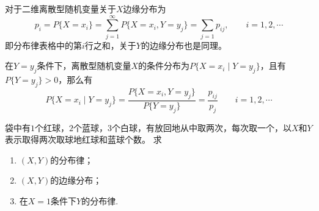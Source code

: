 对于二维离散型随机变量关于$X$边缘分布为
\begin{equation}
    p_i = P\{ X=x_i \} = \sum_{j=1}^\infty P\{ X=x_i, Y=y_j \} = \sum_{j=1} p_{ij}, \qquad i=1,2,\cdots
\end{equation}
即分布律表格中的第$i$行之和，关于$Y$的边缘分布也是同理。

在$Y=y_j$条件下，离散型随机变量$X$的条件分布为$P\{X=x_i\mid Y=y_j\}$，且有$P\{ Y=y_j \}>0$，那么有
\begin{equation}
    P\{ X=x_i \mid Y = y_j \} = \frac{P\{ X=x_i, Y=y_j \}}{P\{ Y=y_j \}} = \frac{p_{ij}}{p_j} \qquad i=1,2,\cdots
\end{equation}

\begin{example}
    袋中有$1$个红球，$2$个蓝球，$3$个白球，有放回地从中取两次，每次取一个，以$X$和$Y$表示取得两次取球地红球和蓝球个数。
    求
    \begin{enumerate}[(1)]
        \item $(X,Y)$的分布律；
        \item $(X,Y)$的边缘分布；
        \item 在$X=1$条件下$Y$的分布律.
    \end{enumerate}
\end{example}
